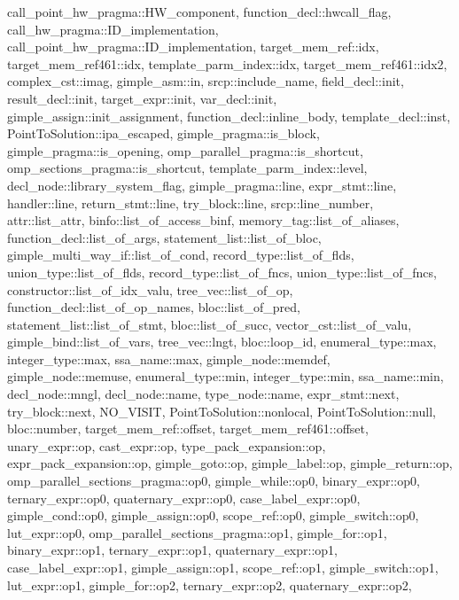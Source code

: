 call\+\_\+point\+\_\+hw\+\_\+pragma\+::\+H\+W\+\_\+component, function\+\_\+decl\+::hwcall\+\_\+flag, call\+\_\+hw\+\_\+pragma\+::\+I\+D\+\_\+implementation, call\+\_\+point\+\_\+hw\+\_\+pragma\+::\+I\+D\+\_\+implementation, target\+\_\+mem\+\_\+ref\+::idx, target\+\_\+mem\+\_\+ref461\+::idx, template\+\_\+parm\+\_\+index\+::idx, target\+\_\+mem\+\_\+ref461\+::idx2, complex\+\_\+cst\+::imag, gimple\+\_\+asm\+::in, srcp\+::include\+\_\+name, field\+\_\+decl\+::init, result\+\_\+decl\+::init, target\+\_\+expr\+::init, var\+\_\+decl\+::init, gimple\+\_\+assign\+::init\+\_\+assignment, function\+\_\+decl\+::inline\+\_\+body, template\+\_\+decl\+::inst, Point\+To\+Solution\+::ipa\+\_\+escaped, gimple\+\_\+pragma\+::is\+\_\+block, gimple\+\_\+pragma\+::is\+\_\+opening, omp\+\_\+parallel\+\_\+pragma\+::is\+\_\+shortcut, omp\+\_\+sections\+\_\+pragma\+::is\+\_\+shortcut, template\+\_\+parm\+\_\+index\+::level, decl\+\_\+node\+::library\+\_\+system\+\_\+flag, gimple\+\_\+pragma\+::line, expr\+\_\+stmt\+::line, handler\+::line, return\+\_\+stmt\+::line, try\+\_\+block\+::line, srcp\+::line\+\_\+number, attr\+::list\+\_\+attr, binfo\+::list\+\_\+of\+\_\+access\+\_\+binf, memory\+\_\+tag\+::list\+\_\+of\+\_\+aliases, function\+\_\+decl\+::list\+\_\+of\+\_\+args, statement\+\_\+list\+::list\+\_\+of\+\_\+bloc, gimple\+\_\+multi\+\_\+way\+\_\+if\+::list\+\_\+of\+\_\+cond, record\+\_\+type\+::list\+\_\+of\+\_\+flds, union\+\_\+type\+::list\+\_\+of\+\_\+flds, record\+\_\+type\+::list\+\_\+of\+\_\+fncs, union\+\_\+type\+::list\+\_\+of\+\_\+fncs, constructor\+::list\+\_\+of\+\_\+idx\+\_\+valu, tree\+\_\+vec\+::list\+\_\+of\+\_\+op, function\+\_\+decl\+::list\+\_\+of\+\_\+op\+\_\+names, bloc\+::list\+\_\+of\+\_\+pred, statement\+\_\+list\+::list\+\_\+of\+\_\+stmt, bloc\+::list\+\_\+of\+\_\+succ, vector\+\_\+cst\+::list\+\_\+of\+\_\+valu, gimple\+\_\+bind\+::list\+\_\+of\+\_\+vars, tree\+\_\+vec\+::lngt, bloc\+::loop\+\_\+id, enumeral\+\_\+type\+::max, integer\+\_\+type\+::max, ssa\+\_\+name\+::max, gimple\+\_\+node\+::memdef, gimple\+\_\+node\+::memuse, enumeral\+\_\+type\+::min, integer\+\_\+type\+::min, ssa\+\_\+name\+::min, decl\+\_\+node\+::mngl, decl\+\_\+node\+::name, type\+\_\+node\+::name, expr\+\_\+stmt\+::next, try\+\_\+block\+::next, N\+O\+\_\+\+V\+I\+S\+IT, Point\+To\+Solution\+::nonlocal, Point\+To\+Solution\+::null, bloc\+::number, target\+\_\+mem\+\_\+ref\+::offset, target\+\_\+mem\+\_\+ref461\+::offset, unary\+\_\+expr\+::op, cast\+\_\+expr\+::op, type\+\_\+pack\+\_\+expansion\+::op, expr\+\_\+pack\+\_\+expansion\+::op, gimple\+\_\+goto\+::op, gimple\+\_\+label\+::op, gimple\+\_\+return\+::op, omp\+\_\+parallel\+\_\+sections\+\_\+pragma\+::op0, gimple\+\_\+while\+::op0, binary\+\_\+expr\+::op0, ternary\+\_\+expr\+::op0, quaternary\+\_\+expr\+::op0, case\+\_\+label\+\_\+expr\+::op0, gimple\+\_\+cond\+::op0, gimple\+\_\+assign\+::op0, scope\+\_\+ref\+::op0, gimple\+\_\+switch\+::op0, lut\+\_\+expr\+::op0, omp\+\_\+parallel\+\_\+sections\+\_\+pragma\+::op1, gimple\+\_\+for\+::op1, binary\+\_\+expr\+::op1, ternary\+\_\+expr\+::op1, quaternary\+\_\+expr\+::op1, case\+\_\+label\+\_\+expr\+::op1, gimple\+\_\+assign\+::op1, scope\+\_\+ref\+::op1, gimple\+\_\+switch\+::op1, lut\+\_\+expr\+::op1, gimple\+\_\+for\+::op2, ternary\+\_\+expr\+::op2, quaternary\+\_\+expr\+::op2, 